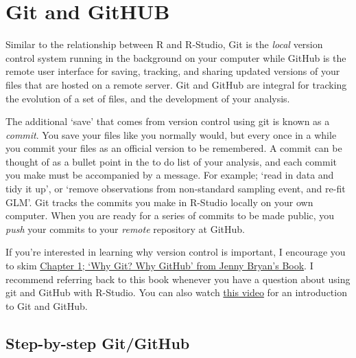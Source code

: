 \documentclass[]{book}
\begin{document}
\section{Git and GitHUB}\label{git-and-github}

Similar to the relationship between R and R-Studio, Git is the
\emph{local} version control system running in the background on your
computer while GitHub is the remote user interface for saving, tracking,
and sharing updated versions of your files that are hosted on a remote
server. Git and GitHub are integral for tracking the evolution of a set
of files, and the development of your analysis.

The additional `save' that comes from version control using git is known
as a \emph{commit}. You save your files like you normally would, but
every once in a while you commit your files as an official version to be
remembered. A commit can be thought of as a bullet point in the to do
list of your analysis, and each commit you make must be accompanied by a
message. For example; `read in data and tidy it up', or `remove
observations from non-standard sampling event, and re-fit GLM'. Git
tracks the commits you make in R-Studio locally on your own computer.
When you are ready for a series of commits to be made public, you
\emph{push} your commits to your \emph{remote} repository at GitHub.

If you're interested in learning why version control is important, I
encourage you to skim
\href{http://happygitwithr.com/big-picture.html\#why-git}{Chapter 1;
`Why Git? Why GitHub' from Jenny Bryan's Book}. I recommend referring
back to this book whenever you have a question about using git and
GitHub with R-Studio. You can also watch
\href{https://www.youtube.com/watch?v=FyfwLX4HAxM}{this video} for an
introduction to Git and GitHub.

\subsection{Step-by-step Git/GitHub}\label{step-by-step-gitgithub}
\end{document}
